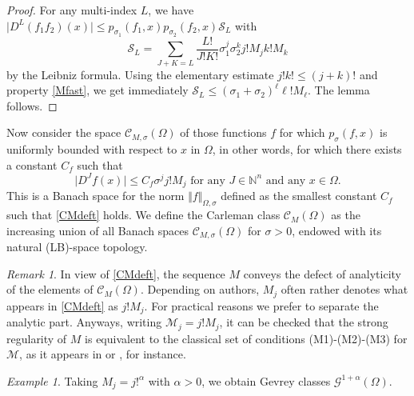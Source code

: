 \documentclass[a4paper]{amsart}
\theoremstyle{plain}
\theoremstyle{definition}
\theoremstyle{remark}
\newtheorem{rem}[subsubsection]{Remark}
\newtheorem*{exam}{Example}
\begin{document}
\begin{proof} For any multi-index $ L $, we have
$ \vert D^L(f_1f_2)(x)\vert\leq p_{\sigma_1}(f_1,x)p_{\sigma_2}(f_2,x)\mathcal{S}_L $ with
\begin{equation*}
\mathcal{S}_L= \sum_{J+K=L}\frac{L!}{J!K!}\sigma_1^j\sigma_2^k j!M_j
k!M_k
\end{equation*}
by the Leibniz formula. Using the elementary estimate $ j!k!\leq (j+k)! $ and property \eqref{Mfast}, we get immediately
$ \mathcal{S}_L\leq (\sigma_1+\sigma_2)^\ell \ell!M_\ell $. The lemma follows.
\end{proof}

Now consider the space $ \mathcal{C}_{M,\sigma}(\Omega) $ of those functions $ f $ for which
$ p_\sigma(f,x) $ is uniformly bounded with respect to $ x $ in $ \Omega $, in other words, for which there exists a constant $ C_f $ such that
\begin{equation}\label{CMdeft}
\vert D^Jf(x)\vert\leq C_f\sigma^j j!M_j\text{ for any }J \in\mathbb{N}^n\text{ and any }x\in \Omega.
\end{equation}
This is a Banach space for the norm $ \Vert f\Vert_{\Omega,\sigma} $ defined as the smallest constant $ C_f $ such that \eqref{CMdeft} holds.  
We define the Carleman class $ \mathcal{C}_M(\Omega) $ as the increasing union
of all Banach spaces $ \mathcal{C}_{M,\sigma}(\Omega) $ for $ \sigma>0 $, endowed
with its natural (LB)-space topology.

\begin{rem}
In view of \eqref{CMdeft}, the sequence $ M $ conveys
the defect of analyticity of the elements of $ \mathcal{C}_M(\Omega) $.  
Depending on authors, $ M_j $ often rather denotes what appears in
\eqref{CMdeft} as $ j!M_j $. For practical reasons we prefer to separate the analytic part. Anyways, writing
$ \mathcal{M}_j=j!M_j $, it can be checked that the strong regularity of
$ M $ is equivalent to the classical set of conditions 
(M1)-(M2)-(M3) for $ \mathcal{M} $, as it appears
in \cite{BBMT} or \cite{Kom}, for instance.
\end{rem}

\begin{exam}
Taking $ M_j=j!^\alpha $ with $ \alpha>0 $, we obtain
Gevrey classes $ \mathcal{G}^{1+\alpha}(\Omega) $.
\end{exam}  
\end{document}
